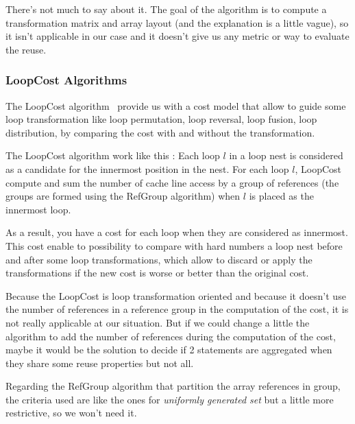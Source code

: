 \documentclass[paper=a4, fontsize=11pt]{scrartcl}
\numberwithin{equation}{section}        %
\numberwithin{figure}{section}          %
\numberwithin{table}{section}               %
\begin{document}
            There's not much to say about it. The goal of the algorithm is to
            compute a transformation matrix and array layout (and the explanation is a little
            vague), so it isn't applicable in our case and it doesn't give us any metric or way to evaluate the reuse.
        
        \subsubsection{LoopCost Algorithms}
            The LoopCost algorithm~\cite{McKinley:1996:IDL:233561.233564} provide
            us with a cost model that allow to guide some loop transformation like
            loop permutation, loop reversal, loop fusion, loop distribution,
            by comparing the cost with and without the transformation.
            
            The LoopCost algorithm work like this : 
            Each loop $l$ in a loop nest is considered as a candidate for the innermost
            position in the nest. For each loop $l$, LoopCost compute and sum the number
            of cache line access by a group of references (the groups are formed
            using the RefGroup algorithm) when $l$ is placed as the innermost loop.

            As a result, you have a cost for each loop when they are considered as innermost.
            This cost enable to possibility to compare with hard numbers
            a loop nest before and after some loop transformations, which allow to discard
            or apply the transformations if the new cost is worse or better than the
            original cost.
            \bigskip

            Because the LoopCost is loop transformation oriented and because it doesn't
            use the number of references in a reference group in the computation
            of the cost, it is not really applicable at our situation.
            But if we could change a little the algorithm to add the number of
            references during the computation of the cost, maybe it would be the
            solution to decide if 2 statements are aggregated when they share
            some reuse properties but not all.

            Regarding the RefGroup algorithm that partition the array references
            in group, the criteria used are like the ones for \textit{uniformly generated set}
            but a little more restrictive, so we won't need it.
            
\end{document}
